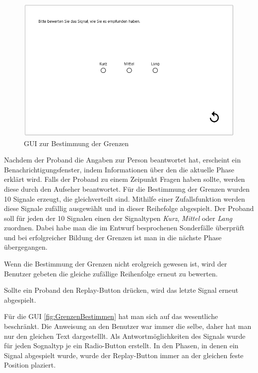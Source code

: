 \begin{figure}
	\centering
    \includegraphics[width=\textwidth]{pics/gui/GrenzenBestimmen.png}
    \caption{GUI zur Bestimmung der Grenzen}
    \label{fig:GrenzenBestimmen}
\end{figure}

Nachdem der Proband die Angaben zur Person beantwortet hat, erscheint ein Benachrichtigungsfenster, indem Informationen {\"u}ber den die aktuelle Phase erkl{\"a}rt wird. 
Falls der Proband zu einem Zeipunkt Fragen haben sollte, werden diese durch den Aufseher beantwortet.
F{\"u}r die Bestimmung der Grenzen wurden 10 Signale erzeugt, die gleichverteilt sind. 
Mithilfe einer Zufallsfunktion werden diese Signale zuf{\"a}llig ausgew{\"a}hlt und in dieser Reihefolge abgespielt. 
Der Proband soll f{\"u}r jeden der 10 Signalen einen der Signaltypen \textit{Kurz}, \textit{Mittel} oder \textit{Lang} zuordnen. 
Dabei habe man die im Entwurf besprochenen Sonderf{\"a}lle {\"u}berpr{\"u}ft und bei erfolgreicher Bildung der Grenzen ist man in die n{\"a}chste Phase {\"u}bergegangen.

Wenn die Bestimmung der Grenzen nicht erolgreich gewesen ist, wird der Benutzer gebeten die gleiche zuf{\"a}llige Reihenfolge erneut zu bewerten. 

Sollte ein Proband den Replay-Button dr{\"u}cken, wird das letzte Signal erneut abgespielt.

F{\"u}r die GUI \autoref{fig:GrenzenBestimmen} hat man sich auf das wesentliche beschr{\"a}nkt. Die Anweisung an den Benutzer war immer die selbe, daher hat man nur den gleichen Text dargestelllt. Als Antwortm{\"o}glichkeiten des Signals wurde f{\"u}r jeden Sognaltyp je ein Radio-Button erstellt. 
In den Phasen, in denen ein Signal abgespielt wurde, wurde der Replay-Button immer an der gleichen feste Position plaziert. 

